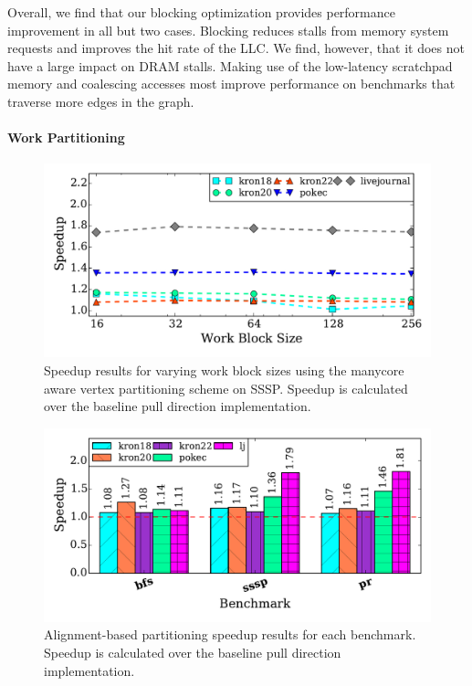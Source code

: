Overall, we find that our blocking optimization provides performance improvement in all but two cases. 
Blocking reduces stalls from memory system requests and improves the hit rate of the LLC. We find, however, that it does not have a large impact on DRAM stalls.
Making use of the low-latency scratchpad memory and coalescing accesses most improve performance on benchmarks that traverse more edges in the graph. 
 
\paragraph{Work Partitioning}
 
\begin{figure}[t]
    \centering
    \includegraphics[scale=0.5]{graphit-figures/sssp-cache.pdf}
    \caption{Speedup results for varying work block sizes using the manycore aware vertex partitioning scheme on SSSP. Speedup is calculated over the baseline pull direction implementation.}
    \label{pap:generals:sec:eval:fig:ssspcache}
\end{figure}
 
\begin{figure}[t]
    \centering
    \includegraphics[scale = 0.5]{graphit-figures/align.pdf}
    \caption{Alignment-based partitioning speedup results for each benchmark. Speedup is calculated over the baseline pull direction implementation.} %
    \label{pap:generals:sec:eval:fig:aligned}
    \vspace{-2mm} 
\end{figure}
 
